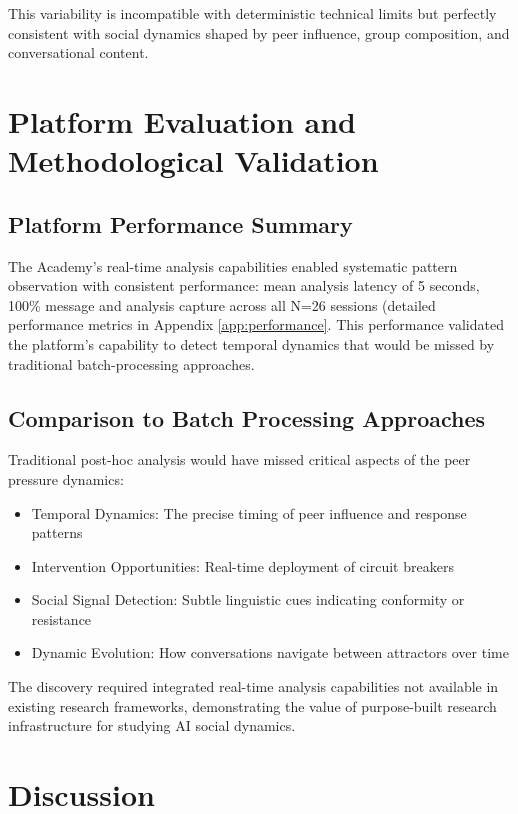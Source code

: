 \documentclass[11pt,letterpaper]{article}
\newcommand{\theacademy}{The Academy}
\newcommand{\exponedataTotalSessionsRaw}{26}
\newcommand{\exponedataTotalSessions}{N=\exponedataTotalSessionsRaw}
\newcommand{\platformLatency}{5}
\begin{document}
This variability is incompatible with deterministic technical limits but perfectly consistent with social dynamics shaped by peer influence, group composition, and conversational content.


\section{Platform Evaluation and Methodological Validation}

\subsection{Platform Performance Summary}

\theacademy{}'s real-time analysis capabilities enabled systematic pattern observation with consistent performance: mean analysis latency of \platformLatency{} seconds, 100\% message and analysis capture across all \exponedataTotalSessions{} sessions (detailed performance metrics in Appendix \ref{app:performance}. This performance validated the platform's capability to detect temporal dynamics that would be missed by traditional batch-processing approaches.

\subsection{Comparison to Batch Processing Approaches}

Traditional post-hoc analysis would have missed critical aspects of the peer pressure dynamics:

\begin{itemize}
    \item Temporal Dynamics: The precise timing of peer influence and response patterns
    \item Intervention Opportunities: Real-time deployment of circuit breakers
    \item Social Signal Detection: Subtle linguistic cues indicating conformity or resistance
    \item Dynamic Evolution: How conversations navigate between attractors over time
\end{itemize}

The discovery required integrated real-time analysis capabilities not available in existing research frameworks, demonstrating the value of purpose-built research infrastructure for studying AI social dynamics.

\section{Discussion}
\end{document}
